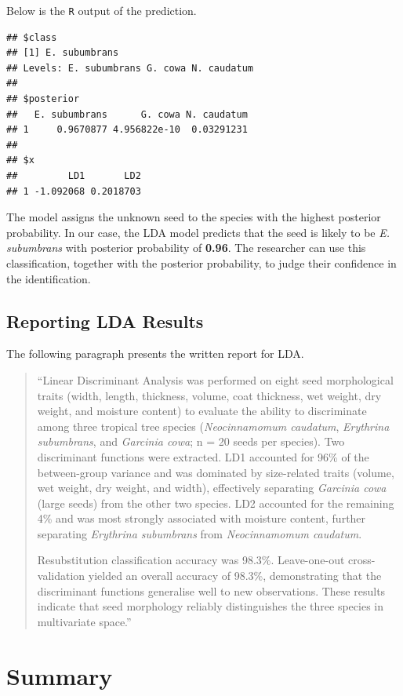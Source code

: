 \documentclass[
]{book}
\begin{document}
Below is the \texttt{R} output of the prediction.

\begin{verbatim}
## $class
## [1] E. subumbrans
## Levels: E. subumbrans G. cowa N. caudatum
## 
## $posterior
##   E. subumbrans      G. cowa N. caudatum
## 1     0.9670877 4.956822e-10  0.03291231
## 
## $x
##         LD1       LD2
## 1 -1.092068 0.2018703
\end{verbatim}

The model assigns the unknown seed to the species with the highest posterior probability. In our case, the LDA model predicts that the seed is likely to be \emph{E. subumbrans} with posterior probability of \textbf{0.96}. The researcher can use this classification, together with the posterior probability, to judge their confidence in the identification.

\subsection{Reporting LDA Results}\label{reporting-lda-results}

The following paragraph presents the written report for LDA.

\begin{quote}
``Linear Discriminant Analysis was performed on eight seed morphological traits (width, length, thickness, volume, coat thickness, wet weight, dry weight, and moisture content) to evaluate the ability to discriminate among three tropical tree species (\emph{Neocinnamomum caudatum}, \emph{Erythrina subumbrans}, and \emph{Garcinia cowa}; n = 20 seeds per species). Two discriminant functions were extracted. LD1 accounted for 96\% of the between-group variance and was dominated by size-related traits (volume, wet weight, dry weight, and width), effectively separating \emph{Garcinia cowa} (large seeds) from the other two species. LD2 accounted for the remaining 4\% and was most strongly associated with moisture content, further separating \emph{Erythrina subumbrans} from \emph{Neocinnamomum caudatum}.

Resubstitution classification accuracy was 98.3\%. Leave-one-out cross-validation yielded an overall accuracy of 98.3\%, demonstrating that the discriminant functions generalise well to new observations. These results indicate that seed morphology reliably distinguishes the three species in multivariate space.''
\end{quote}

\section{Summary}\label{summary-1}
\end{document}
